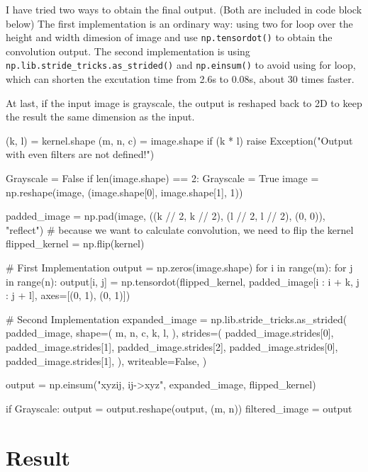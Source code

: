 I have tried two ways to obtain the final output. (Both are included in code block below) The first implementation is an ordinary way: using two for loop over the height and width dimesion of image and use \verb|np.tensordot()| to obtain the convolution output. The second implementation is using \verb|np.lib.stride_tricks.as_strided()| and \verb|np.einsum()| to avoid using for loop, which can shorten the excutation time from 2.6s to 0.08s, about 30 times faster.

At last, if the input image is grayscale, the output is reshaped back to 2D to keep the result the same dimension as the input.

\begin{python}
(k, l) = kernel.shape
(m, n, c) = image.shape
if (k * l) %
    raise Exception("Output with even filters are not defined!")

Grayscale = False
if len(image.shape) == 2:
    Grayscale = True
    image = np.reshape(image, (image.shape[0], image.shape[1], 1))

padded_image = np.pad(image, ((k // 2, k // 2), (l // 2, l // 2), (0, 0)), "reflect")
# because we want to calculate convolution, we need to flip the kernel
flipped_kernel = np.flip(kernel)

# First Implementation
output = np.zeros(image.shape)
for i in range(m):
    for j in range(n):
        output[i, j] = np.tensordot(flipped_kernel, padded_image[i : i + k, j : j + l], axes=[(0, 1), (0, 1)])

# Second Implementation
expanded_image = np.lib.stride_tricks.as_strided(
        padded_image,
        shape=(
            m,
            n,
            c,
            k,
            l,
        ),
        strides=(
            padded_image.strides[0],
            padded_image.strides[1],
            padded_image.strides[2],
            padded_image.strides[0],
            padded_image.strides[1],
        ),
        writeable=False,
    )

output = np.einsum("xyzij, ij->xyz", expanded_image, flipped_kernel)

if Grayscale:
    output = output.reshape(output, (m, n))
filtered_image = output
\end{python}

\newpage
\section*{Result}

